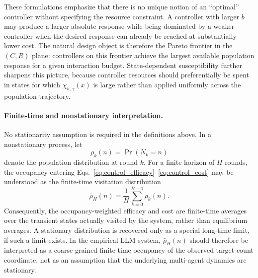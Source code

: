 These formulations emphasize that there is no unique notion of an ``optimal'' controller without specifying the resource constraint. A controller with larger \(b\) may produce a larger absolute response while being dominated by a weaker controller when the desired response can already be reached at substantially lower cost. The natural design object is therefore the Pareto frontier in the \((C,R)\) plane: controllers on this frontier achieve the largest available population response for a given interaction budget. State-dependent susceptibility further sharpens this picture, because controller resources should preferentially be spent in states for which \(\chi_{h,\gamma}(x)\) is large rather than applied uniformly across the population trajectory.

\paragraph{Finite-time and nonstationary interpretation.}
No stationarity assumption is required in the definitions above. In a nonstationary process, let
\begin{equation}
\rho_k(n)=\Pr(N_k=n)
\end{equation}
denote the population distribution at round \(k\). For a finite horizon of \(H\) rounds, the occupancy entering Eqs.~\eqref{eq:control_efficacy}--\eqref{eq:control_cost} may be understood as the finite-time visitation distribution
\begin{equation}
\boxed{
\bar{\rho}_H(n)
=
\frac{1}{H}
\sum_{k=0}^{H-1}
\rho_k(n).
}
\label{eq:finite_time_occupancy}
\end{equation}
Consequently, the occupancy-weighted efficacy and cost are finite-time averages over the transient states actually visited by the system, rather than equilibrium averages. A stationary distribution is recovered only as a special long-time limit, if such a limit exists. In the empirical LLM system, \(\bar{\rho}_H(n)\) should therefore be interpreted as a coarse-grained finite-time occupancy of the observed target-count coordinate, not as an assumption that the underlying multi-agent dynamics are stationary.
